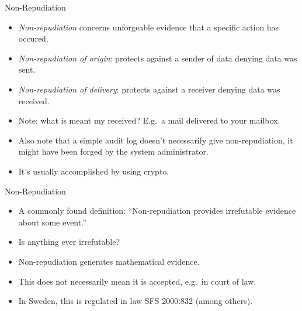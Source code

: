 \documentclass{beamer}
\begin{document}
\begin{frame}{\insertsubsectionhead}{Non-Repudiation}
  \begin{itemize}
    \item \emph{Non-repudiation} concerns unforgeable evidence that a specific 
      action has occured.

    \item \emph{Non-repudiation of origin}: protects against a sender of data 
      denying data was sent.

    \item \emph{Non-repudiation of delivery}: protects against a receiver 
      denying data was received.

    \item Note: what is meant my received?
      E.g.~a mail delivered to your mailbox.

    \item Also note that a simple audit log doesn't necessarily give 
      non-repudiation, it might have been forged by the system administrator.

    \item It's usually accomplished by using crypto.
  \end{itemize}
\end{frame}

\begin{frame}{\insertsubsectionhead}{Non-Repudiation}
  \begin{itemize}
    \item A commonly found definition: ``Non-repudiation provides irrefutable 
      evidence about some event.''

    \item Is anything ever irrefutable?

    \item Non-repudiation generates mathematical evidence.

    \item This does not necessarily mean it is accepted, e.g.~in court of law.

    \item In Sweden, this is regulated in law SFS 2000:832 (among others).
  \end{itemize}
\end{frame}
\end{document}

